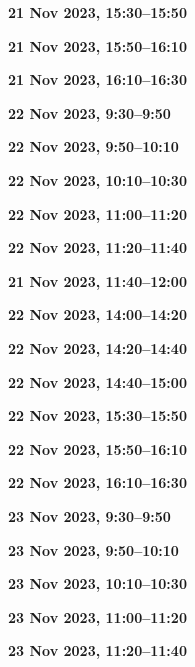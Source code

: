 \documentclass[12pt]{extbook}
\newcommand{\breaktime}[1]{
\bigskip
\begin{center}
\Large\bfseries ***** Break #1 *****
\end{center}
\bigskip}
\renewcommand{\breaktime}[1]{}
\newcommand{\abstract}[2]{{
\bigskip
\begin{center}
\large\bfseries #1
\end{center}}
\par

\clearpage
}
\begin{document}
\abstract{21 Nov 2023, 15:30--15:50}{abstracts/Kipfer} %
\abstract{21 Nov 2023, 15:50--16:10}{abstracts/vanRooyen} %
\abstract{21 Nov 2023, 16:10--16:30}{abstracts/Gisiger} %


\abstract{22 Nov 2023, 9:30--9:50}{abstracts/Jacops} %
\abstract{22 Nov 2023, 9:50--10:10}{abstracts/Tomonaga} %
\abstract{22 Nov 2023, 10:10--10:30}{abstracts/Kim} %

\breaktime{30 min}

\abstract{22 Nov 2023, 11:00--11:20}{abstracts/vanLeeuw} %
\abstract{22 Nov 2023, 11:20--11:40}{abstracts/Currle} %
\abstract{21 Nov 2023, 11:40--12:00}{abstracts/Finger}

\breaktime{ / Lunch}


\abstract{22 Nov 2023, 14:00--14:20}{abstracts/Schilling} %
\abstract{22 Nov 2023, 14:20--14:40}{abstracts/Brennwald} %
\abstract{22 Nov 2023, 14:40--15:00}{abstracts/Blanc} %


\breaktime{30 min}

\abstract{22 Nov 2023, 15:30--15:50}{abstracts/Marion} %
\abstract{22 Nov 2023, 15:50--16:10}{abstracts/Picard} %
\abstract{22 Nov 2023, 16:10--16:30}{abstracts/Engelhardt} %



\abstract{23 Nov 2023, 9:30--9:50}{abstracts/Musy} %
\abstract{23 Nov 2023, 9:50--10:10}{abstracts/Rinaldi} %
\abstract{23 Nov 2023, 10:10--10:30}{abstracts/GroegerTrampe} %

\breaktime{30 min}

\abstract{23 Nov 2023, 11:00--11:20}{abstracts/Iwe} %
\abstract{23 Nov 2023, 11:20--11:40}{abstracts/Slagter} %
\end{document}
